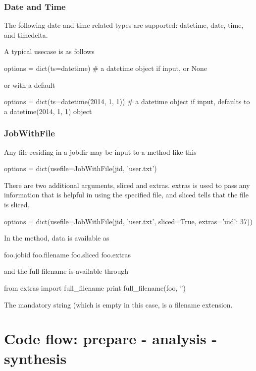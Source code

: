\subsubsection*{Date and Time}
The following date and time related types are supported:
datetime, date, time, and timedelta.

A typical usecase is as follows

\begin{python}
options = dict(ts=datetime)
# a datetime object if input, or None
\end{python}
or with a default

\begin{python}
options = dict(ts=datetime(2014, 1, 1))
#  a datetime object if input, defaults to a datetime(2014, 1, 1) object
\end{python}


\subsubsection*{JobWithFile}
Any file residing in a jobdir may be input to a method like this

\begin{python}
options = dict(usefile=JobWithFile(jid, 'user.txt')
\end{python}

There are two additional arguments, sliced and extras.  extras is used
to pass any information that is helpful in using the specified file,
and sliced tells that the file is sliced.

\begin{python}
options = dict(usefile=JobWithFile(jid, 'user.txt', sliced=True, extras={'uid': 37}))
\end{python}
In the method, data is available as

\begin{python}
  foo.jobid
  foo.filename
  foo.sliced
  foo.extras
\end{python}
and the full filename is available through

\begin{python}
from extras import full_filename
print full_filename(foo, '')
\end{python}
The mandatory string (which is empty in this case, is a filename
extension.







\newpage
\section{Code flow:  prepare - analysis - synthesis}

